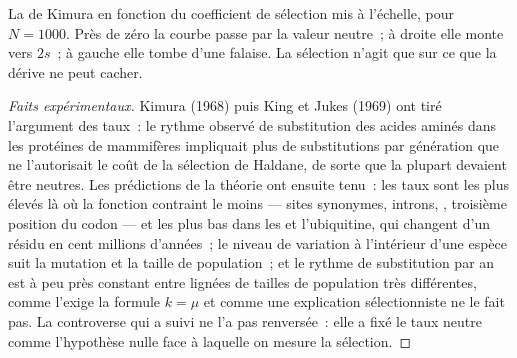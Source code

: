 \begin{omfigure}

{\small La  de Kimura en fonction du coefficient
de sélection mis à l'échelle, pour $N = 1000$. Près de zéro la courbe
passe par la valeur neutre~; à droite elle monte vers $2s$~; à gauche
elle tombe d'une falaise. La sélection n'agit que sur ce que la dérive
ne peut cacher.}
\end{omfigure}

\begin{proof}[Faits expérimentaux]
Kimura (1968) puis King et Jukes (1969) ont tiré l'argument des taux~:
le rythme observé de substitution des acides aminés dans les protéines
de mammifères impliquait plus de substitutions par génération que ne
l'autorisait le coût de la sélection de Haldane, de sorte que la plupart
devaient être neutres. Les prédictions de la théorie ont ensuite tenu~:
les taux sont les plus élevés là où la fonction contraint le moins ---
sites synonymes, introns, , troisième position du codon ---
et les plus bas dans les  et l'ubiquitine, qui changent d'un
résidu en cent millions d'années~; le niveau de variation à l'intérieur
d'une espèce suit la mutation et la taille de population~; et le rythme
de substitution par an est à peu près constant entre lignées de tailles
de population très différentes, comme l'exige la formule $k = \mu$ et
comme une explication sélectionniste ne le fait pas. La controverse qui
a suivi ne l'a pas renversée~: elle a fixé le taux neutre comme
l'hypothèse nulle face à laquelle on mesure la sélection.
\end{proof}

